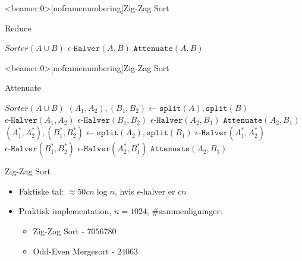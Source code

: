 \begin{frame}<beamer:0>[noframenumbering]{Zig-Zag Sort}
	\begin{block}{Reduce}
 		\begin{algorithmic}
					\State $Sorter(A \cup B)$
				\EndIf
				\State $\epsilon \mbox{-}\mathtt{Halver}(A,B)$
				\State $\mathtt{Attenuate}(A,B)$
			\EndProcedure
		\end{algorithmic}
	\end{block}
\end{frame}

\begin{frame}<beamer:0>[noframenumbering]{Zig-Zag Sort}
	\begin{block}{Attenuate}
 		\begin{algorithmic}
 		\footnotesize
			\Procedure{Attenuate}{$A, B$}
				\If {$|A| + |B| \leq 8$}
					\State $Sorter(A \cup B)$
				\EndIf
				\State $(A_1, A_2), (B_1, B_2) \gets \mathtt{split}(A), \mathtt{split}(B)$
				\State $\epsilon \mbox{-}\mathtt{Halver}(A_1,A_2)$
				\State $\epsilon \mbox{-}\mathtt{Halver}(B_1,B_2)$
				\State $\epsilon \mbox{-}\mathtt{Halver}(A_2,B_1)$
				\State $\mathtt{Attenuate}(A_2,B_1)$
				\State $(A^*_1, A^*_2), (B^*_1, B^*_2) \gets \mathtt{split}(A_2), \mathtt{split}(B_1)$
				\State $\epsilon \mbox{-}\mathtt{Halver}(A^*_1,A^*_2)$
				\State $\epsilon \mbox{-}\mathtt{Halver}(B^*_1,B^*_2)$
				\State $\epsilon \mbox{-}\mathtt{Halver}(A^*_2,B^*_1)$
				\State $\mathtt{Attenuate}(A_2,B_1)$
			\EndProcedure
		\end{algorithmic}
	\end{block}
\end{frame}

\begin{frame}{Zig-Zag Sort}
	\begin{itemize}
		\item Faktiske tal: $\approx 50 cn \log n$, hvis $\epsilon$-halver er $cn$
		\item Praktisk implementation, $n = 1024$, \#sammenligninger:
			\begin{itemize}
				\item Zig-Zag Sort - $7056780$
				\item Odd-Even Mergesort - $24063$
			\end{itemize}
	\end{itemize}
\end{frame}
